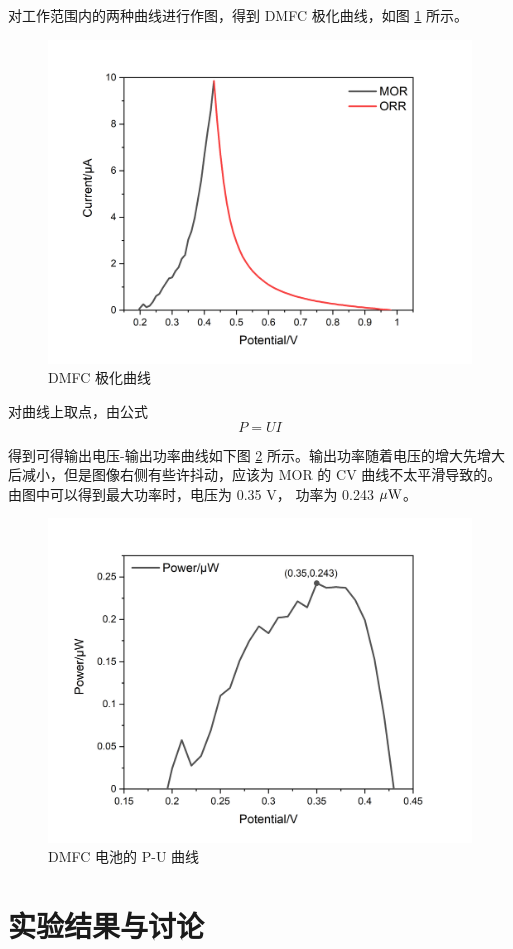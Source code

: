\documentclass[cn,hazy,pku,12pt,normal,math=newtx,cite=super]{elegantnote}
\begin{document}
对工作范围内的两种曲线进行作图，得到 DMFC 极化曲线，如图 \ref{11} 所示。

\begin{figure}[htbp]
    \centering
    \includegraphics[width = .70\textwidth]{image/Graph12.png}
    \caption{DMFC 极化曲线}\label{11}
\end{figure}

对曲线上取点，由公式
$$
P = UI
$$

得到可得输出电压-输出功率曲线如下图 \ref{12} 所示。输出功率随着电压的增大先增大后减小，但是图像右侧有些许抖动，应该为 MOR 的 CV 曲线不太平滑导致的。由图中可以得到最大功率时，电压为 0.35 V，
功率为 0.243 $\rm \mu W$。

\begin{figure}[htbp]
    \centering
    \includegraphics[width = .70\textwidth]{image/Graph14.png}
    \caption{DMFC 电池的 P-U 曲线}\label{12}
\end{figure}


\newpage

\section{实验结果与讨论}
\end{document}
